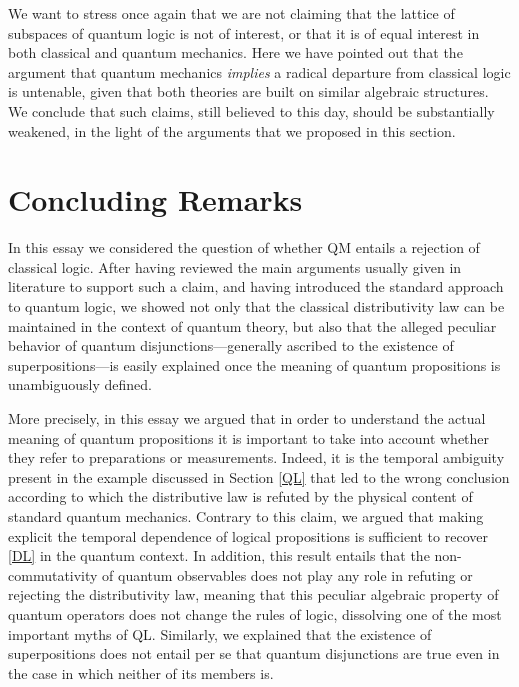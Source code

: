 \documentclass[11pt, executivepaper]{article}
\begin{document}
We want to stress once again that we are not claiming that the lattice of subspaces of quantum logic is not of interest, or that it is of equal interest in both classical and quantum mechanics. Here we have pointed out that the argument that quantum mechanics \emph{implies} a radical departure from classical logic is untenable, given that both theories are built on similar algebraic structures. We conclude that such claims, still believed to this day, should be substantially weakened, in the light of the arguments that we proposed in this section. 

\section{Concluding Remarks}
\label{conc}

In this essay we considered the question of whether QM entails a rejection of classical logic. After having reviewed the main arguments usually given in literature to support such a claim, and having introduced the standard approach to quantum logic, we showed not only that the classical distributivity law can be maintained in the context of quantum theory, but also that the alleged peculiar behavior of quantum disjunctions---generally ascribed to the existence of superpositions---is easily explained once the meaning of quantum propositions is unambiguously defined. 

More precisely, in this essay we argued that in order to understand the actual meaning of quantum propositions it is important to take into account whether they refer to preparations or measurements. Indeed, it is the temporal ambiguity present in the example discussed in Section \ref{QL} that led to the wrong conclusion according to which the distributive law is refuted by the physical content of standard quantum mechanics. Contrary to this claim, we argued that making explicit the temporal dependence of logical propositions is sufficient to recover \eqref{DL} in the quantum context. In addition, this result entails that the non-commutativity of quantum observables does not play any role in refuting or rejecting the distributivity law, meaning that this peculiar algebraic property of quantum operators does not change the rules of logic, dissolving one of the most important myths of QL. Similarly, we explained that the existence of superpositions does not entail per se that quantum disjunctions are true even in the case in which neither of its members is. 
\end{document}
